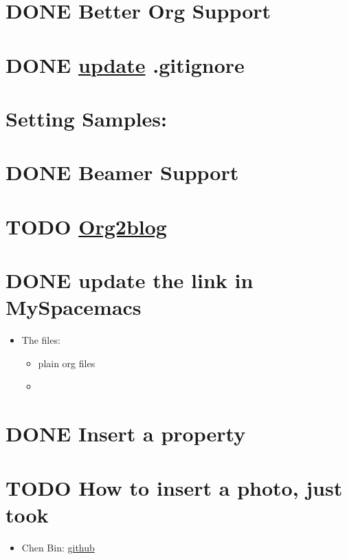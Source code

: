 \documentclass[11pt]{article}
\begin{document}
\section{{\bfseries\sffamily DONE} Better Org Support}
\label{sec:orga2a7d36}
\section{{\bfseries\sffamily DONE} \href{http://www.codeblocq.com/2016/01/Untrack-files-already-added-to-git-repository-based-on-gitignore/}{update} .gitignore}
\label{sec:orge5415fd}
\section{Setting Samples:}
\label{sec:orge65f243}
\section{{\bfseries\sffamily DONE} Beamer Support}
\label{sec:org83d23ed}
\section{{\bfseries\sffamily TODO} \href{https://github.com/org2blog/org2blog}{Org2blog}}
\label{sec:org318ca99}
\section{{\bfseries\sffamily DONE} update the link in MySpacemacs}
\label{sec:org1110622}
\begin{itemize}
\item The files: 
\begin{itemize}
\item plain org files
\item 
\end{itemize}
\end{itemize}
\section{{\bfseries\sffamily DONE} Insert a property}
\label{sec:orgdc1b58e}
\section{{\bfseries\sffamily TODO} How to insert a photo, just took}
\label{sec:orgc1cb310}
\begin{itemize}
\item Chen Bin: \href{https://github.com/redguardtoo/emacs.d}{github}
\end{itemize}
\end{document}
